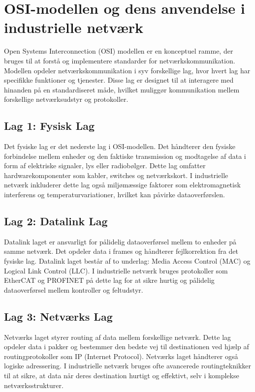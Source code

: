 \section{OSI-modellen og dens anvendelse i industrielle netværk}
Open Systems Interconnection (OSI) modellen er en konceptuel ramme, der bruges til at forstå og implementere standarder for netværkskommunikation. Modellen opdeler netværkskommunikation i syv forskellige lag, hvor hvert lag har specifikke funktioner og tjenester. Disse lag er designet til at interagere med hinanden på en standardiseret måde, hvilket muliggør kommunikation mellem forskellige netværksudstyr og protokoller.

\subsection{Lag 1: Fysisk Lag}
Det fysiske lag er det nederste lag i OSI-modellen. Det håndterer den fysiske forbindelse mellem enheder og den faktiske transmission og modtagelse af data i form af elektriske signaler, lys eller radiobølger. Dette lag omfatter hardwarekomponenter som kabler, switches og netværkskort. I industrielle netværk inkluderer dette lag også miljømæssige faktorer som elektromagnetisk interferens og temperaturvariationer, hvilket kan påvirke dataoverførslen.

\subsection{Lag 2: Datalink Lag}
Datalink laget er ansvarligt for pålidelig dataoverførsel mellem to enheder på samme netværk. Det opdeler data i frames og håndterer fejlkorrektion fra det fysiske lag. Datalink laget består af to underlag: Media Access Control (MAC) og Logical Link Control (LLC). I industrielle netværk bruges protokoller som EtherCAT og PROFINET på dette lag for at sikre hurtig og pålidelig dataoverførsel mellem kontroller og feltudstyr.

\subsection{Lag 3: Netværks Lag}
Netværks laget styrer routing af data mellem forskellige netværk. Dette lag opdeler data i pakker og bestemmer den bedste vej til destinationen ved hjælp af routingprotokoller som IP (Internet Protocol). Netværks laget håndterer også logiske adressering. I industrielle netværk bruges ofte avancerede routingteknikker til at sikre, at data når deres destination hurtigt og effektivt, selv i komplekse netværksstrukturer.

